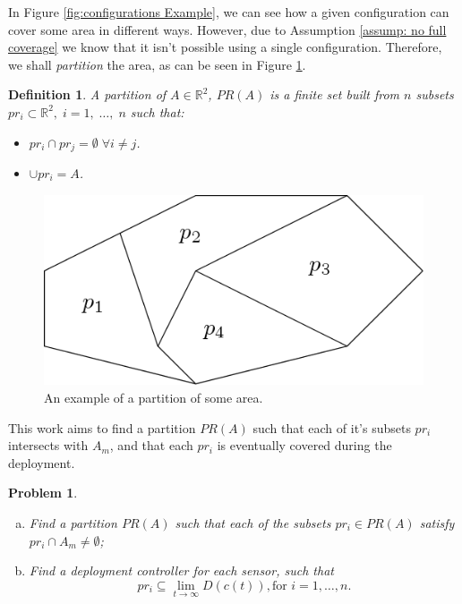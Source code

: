\documentclass{iacas}
\newcommand{\rsqr}{\mathbb{R}^2}
\newtheorem{definition}{Definition}
\newtheorem{problem}{Problem}
\begin{document}

In Figure \ref{fig:configurations Example}, we can see how a given configuration can cover some area in different ways. However, due to Assumption \ref{assump: no full coverage} we know that it isn't possible using a single configuration. Therefore, we shall \emph{partition} the area, as can be seen in Figure \ref{fig:partition example}.

\begin{definition}
A \emph{partition} of $A \in \rsqr$, $PR(A)$ is a finite set built from $n$ subsets $pr_i \subset \rsqr,\; i=1,\; \ldots,\; n$ such that:
\begin{itemize}
\item $pr_i \cap pr_j = \emptyset \; \forall i \neq j$.
\item $\cup pr_i = A$.
\end{itemize}
\end{definition}

\begin{figure}[!ht]
\centering
\includegraphics[scale=0.4]{figures/problem-def/partitioning.png}
\caption{An example of a partition of some area.}
\label{fig:partition example}
\end{figure}

This work aims to find a partition $PR(A)$ such that each of it's subsets $pr_i$ intersects with $A_m$, {and} that each $pr_i$ is eventually covered during the deployment.

\begin{problem} \label{GeneralProblem}

\begin{enumerate}[(a)] 
\item Find a partition $PR(A)$ such that each of the subsets $pr_i \in PR(A)$ satisfy $pr_i \cap A_m \neq \emptyset$;
\item Find a deployment controller for each sensor, such that $$ pr_i \subseteq \lim_{t\rightarrow \infty}D(c(t)),\text{for }i=1,\ldots,n.$$
\end{enumerate}
\end{problem}
\end{document}
